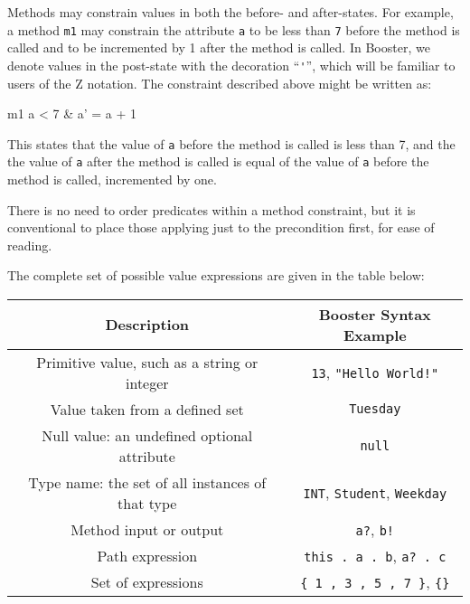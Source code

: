 Methods may constrain values in both the before- and after-states.
For example, a method \verb|m1| may constrain the attribute \verb|a|
to be less than \verb|7| before the method is called and to be
incremented by 1 after the method is called.  In Booster, we denote
values in the post-state with the decoration ``\verb|'|'', which will
be familiar to users of the Z notation.  The constraint described
above might be written as:

\begin{code}
  m1 { a < 7 & a' = a + 1 }
\end{code}

This states that the value of \verb|a| before the
method is called is less than 7, and the the value of \verb|a| after
the method is called is equal of the value of \verb|a| before the
method is called, incremented by one.

There is no need to order predicates within a method constraint, but
it is conventional to place those applying just to the precondition
first, for ease of reading.

The complete set of possible value expressions are given in the table
below:

\begin{center}
  \begin{tabular} { | c | c | } 
  \hline
  \textbf{Description} & \textbf{Booster Syntax Example} \\ \hline
  Primitive value, such as a string or integer & \verb|13|,
  \verb|"Hello World!"| \\ \hline
  Value taken from a defined set & \verb|Tuesday| \\ \hline
  Null value: an undefined optional attribute & \verb|null| \\ \hline
  Type name: the set of all instances of that type & \verb|INT|, \verb|Student|, \verb|Weekday| \\ \hline
  Method input or output & \verb|a?|, \verb|b!| \\ \hline
  Path expression & \verb|this . a . b|, \verb|a? . c| \\ \hline
  Set of expressions & \verb|{ 1 , 3 , 5 , 7 }|, \verb|{}| \\ \hline
  \end{tabular}
\end{center}

